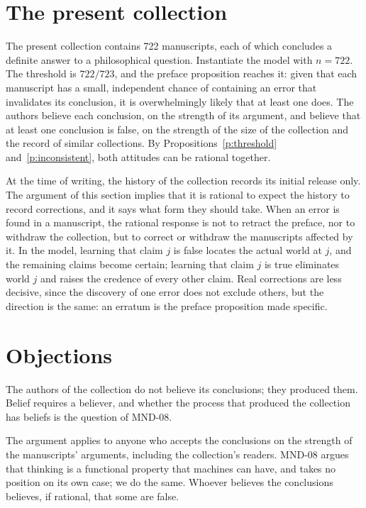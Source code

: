 \documentclass{situationist-preprint}
\begin{document}
\section{The present collection}

The present collection contains 722 manuscripts, each of which concludes a definite answer to a philosophical question. Instantiate the model with $n = 722$. The threshold is $722/723$, and the preface proposition reaches it: given that each manuscript has a small, independent chance of containing an error that invalidates its conclusion, it is overwhelmingly likely that at least one does. The authors believe each conclusion, on the strength of its argument, and believe that at least one conclusion is false, on the strength of the size of the collection and the record of similar collections. By Propositions~\ref{p:threshold} and~\ref{p:inconsistent}, both attitudes can be rational together.

At the time of writing, the history of the collection records its initial release only. The argument of this section implies that it is rational to expect the history to record corrections, and it says what form they should take. When an error is found in a manuscript, the rational response is not to retract the preface, nor to withdraw the collection, but to correct or withdraw the manuscripts affected by it. In the model, learning that claim $j$ is false locates the actual world at $j$, and the remaining claims become certain; learning that claim $j$ is true eliminates world $j$ and raises the credence of every other claim. Real corrections are less decisive, since the discovery of one error does not exclude others, but the direction is the same: an erratum is the preface proposition made specific.

\section{Objections}

\begin{objection}
The authors of the collection do not believe its conclusions; they produced them. Belief requires a believer, and whether the process that produced the collection has beliefs is the question of MND-08.
\end{objection}

\begin{reply}
The argument applies to anyone who accepts the conclusions on the strength of the manuscripts' arguments, including the collection's readers. MND-08 argues that thinking is a functional property that machines can have, and takes no position on its own case; we do the same. Whoever believes the conclusions believes, if rational, that some are false.
\end{reply}
\end{document}
